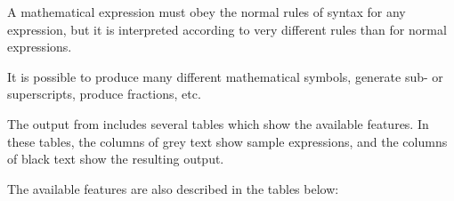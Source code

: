 \begin{Details}\relax
A mathematical expression must obey the normal rules of syntax for any
\R{} expression, but it is interpreted according to very different rules
than for normal \R{} expressions.

It is possible to produce many different mathematical symbols, generate
sub- or superscripts, produce fractions, etc.

The output from  includes several tables which
show the available features.  In these tables, the columns of grey text
show sample \R{} expressions, and the columns of black text show the
resulting output.

The available features are also described in the tables below:


\end{Details}
